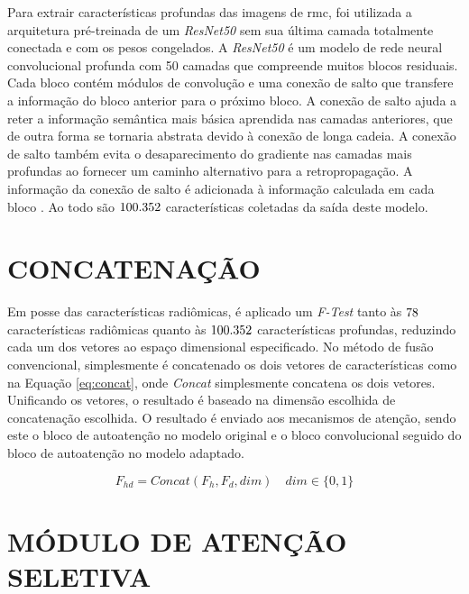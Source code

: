 Para extrair características profundas das imagens de \gls{rmc}, foi utilizada a arquitetura pré-treinada de um \textit{ResNet50} sem sua última camada totalmente conectada e com os pesos congelados. A \textit{ResNet50} é um modelo de rede neural convolucional profunda com 50 camadas que compreende muitos blocos residuais. Cada bloco contém módulos de convolução e uma conexão de salto que transfere a informação do bloco anterior para o próximo bloco. A conexão de salto ajuda a reter a informação semântica mais básica aprendida nas camadas anteriores, que de outra forma se tornaria abstrata devido à conexão de longa cadeia. A conexão de salto também evita o desaparecimento do gradiente nas camadas mais profundas ao fornecer um caminho alternativo para a retropropagação. A informação da conexão de salto é adicionada à informação calculada em cada bloco \cite{aiSelfAttentionBasedFusion2023}. Ao todo são $100.352$ características coletadas da saída deste modelo.

\section{CONCATENAÇÃO}
\label{subsec:cap4_concatenacao}

Em posse das características radiômicas, é aplicado um \textit{F-Test} tanto às $78$ características radiômicas quanto às $100.352$ características profundas, reduzindo cada um dos vetores ao espaço dimensional especificado. No método de fusão convencional, simplesmente é concatenado os dois vetores de características como na Equação \ref{eq:concat}, onde \textit{Concat} simplesmente concatena os dois vetores. Unificando os vetores, o resultado é baseado na dimensão escolhida de concatenação escolhida. O resultado é enviado aos mecanismos de atenção, sendo este o bloco de autoatenção no modelo original e o bloco convolucional seguido do bloco de autoatenção no modelo adaptado.

\begin{equation}
F_{hd} = \textit{Concat}(F_h, F_d, dim) \quad dim \in \{0,1\}
\label{eq:concat}
\end{equation}

\section{MÓDULO DE ATENÇÃO SELETIVA}
\label{subsec:cap4_mod_selective_attn}

